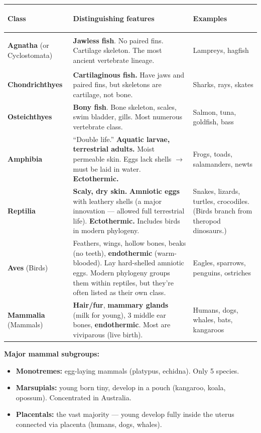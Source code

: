 \documentclass[11pt, letterpaper]{article}
\begin{document}
\noindent
{\small\renewcommand{\arraystretch}{1.6}
\begin{tabularx}{\textwidth}{>{\bfseries\raggedright\arraybackslash}p{2.8cm}
                              >{\raggedright\arraybackslash}X
                              >{\raggedright\arraybackslash}p{3cm}}
\toprule
\rowcolor{tableheaderpurple}
\textbf{Class} & \textbf{Distinguishing features} & \textbf{Examples} \\
\midrule
\rowcolor{rowPu} \textbf{Agnatha} (or Cyclostomata) & \textbf{Jawless fish}. No paired fins. Cartilage skeleton. The most ancient vertebrate lineage. & Lampreys, hagfish \\
\rowcolor{rowA}  \textbf{Chondrichthyes} & \textbf{Cartilaginous fish.} Have jaws and paired fins, but skeletons are cartilage, not bone. & Sharks, rays, skates \\
\rowcolor{rowPu} \textbf{Osteichthyes} & \textbf{Bony fish}. Bone skeleton, scales, swim bladder, gills. Most numerous vertebrate class. & Salmon, tuna, goldfish, bass \\
\rowcolor{rowA}  \textbf{Amphibia}  & ``Double life.'' \textbf{Aquatic larvae, terrestrial adults.} Moist permeable skin. Eggs lack shells $\to$ must be laid in water. \textbf{Ectothermic.} & Frogs, toads, salamanders, newts \\
\rowcolor{rowPu} \textbf{Reptilia}  & \textbf{Scaly, dry skin.} \textbf{Amniotic eggs} with leathery shells (a major innovation --- allowed full terrestrial life). \textbf{Ectothermic.} Includes birds in modern phylogeny. & Snakes, lizards, turtles, crocodiles. (Birds branch from theropod dinosaurs.) \\
\rowcolor{rowA}  \textbf{Aves} (Birds) & Feathers, wings, hollow bones, beaks (no teeth), \textbf{endothermic} (warm-blooded). Lay hard-shelled amniotic eggs. Modern phylogeny groups them within reptiles, but they're often listed as their own class. & Eagles, sparrows, penguins, ostriches \\
\rowcolor{rowPu} \textbf{Mammalia} (Mammals) & \textbf{Hair/fur}, \textbf{mammary glands} (milk for young), 3 middle ear bones, \textbf{endothermic}. Most are viviparous (live birth). & Humans, dogs, whales, bats, kangaroos \\
\bottomrule
\end{tabularx}}

\textbf{Major mammal subgroups:}
\begin{itemize}[noitemsep]
  \item \textbf{Monotremes:} egg-laying mammals (platypus, echidna). Only 5 species.
  \item \textbf{Marsupials:} young born tiny, develop in a pouch (kangaroo, koala, opossum). Concentrated in Australia.
  \item \textbf{Placentals:} the vast majority --- young develop fully inside the uterus connected via placenta (humans, dogs, whales).
\end{itemize}
\end{document}
